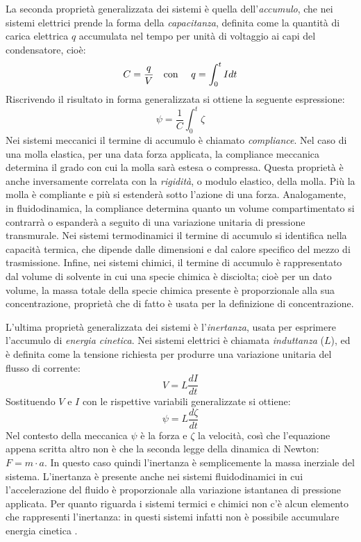 La seconda proprietà generalizzata dei sistemi è quella dell'\textit{accumulo}, che nei sistemi elettrici prende la forma della \textit{capacitanza}, definita come la quantità di carica elettrica $q$ accumulata nel tempo per unità di voltaggio ai capi del condensatore, cioè:
$$C = \frac{q}{V} \text{\quad con \quad} q = \int_0^t{I dt}$$
Riscrivendo il risultato in forma generalizzata si ottiene la seguente espressione:
$$\psi = \frac{1}{C}\int_0^t{\zeta}$$
Nei sistemi meccanici il termine di accumulo è chiamato \textit{compliance}. Nel caso di una molla elastica, per una data forza applicata, la compliance meccanica determina il grado con cui la molla sarà estesa o compressa. Questa proprietà è anche inversamente correlata con la \textit{rigidità}, o modulo elastico, della molla. Più la molla è compliante e più si estenderà sotto l'azione di una forza. Analogamente, in fluidodinamica, la compliance determina quanto un volume compartimentato si contrarrà o espanderà a seguito di una variazione unitaria di pressione transmurale. Nei sistemi termodinamici il termine di accumulo si identifica nella capacità termica, che dipende dalle dimensioni e dal calore specifico del mezzo di trasmissione. Infine, nei sistemi chimici, il termine di accumulo è rappresentato dal volume di solvente in cui una specie chimica è disciolta; cioè per un dato volume, la massa totale della specie chimica presente è proporzionale alla sua concentrazione, proprietà che di fatto è usata per la definizione di concentrazione.

L'ultima proprietà generalizzata dei sistemi è l'\textit{inertanza}, usata per esprimere l'accumulo di \textit{energia cinetica}. Nei sistemi elettrici è chiamata \textit{induttanza} ($L$), ed è definita come la tensione richiesta per produrre una variazione unitaria del flusso di corrente:
$$V = L \frac{dI}{dt}$$
Sostituendo $V$ e $I$ con le rispettive variabili generalizzate si ottiene:
$$\psi = L \frac{d\zeta}{dt}$$
Nel contesto della meccanica $\psi$ è la forza e $\zeta$ la velocità, così che l'equazione appena scritta altro non è che la seconda legge della dinamica di Newton: $F=m \cdot a$. In questo caso quindi l'inertanza è semplicemente la massa inerziale del sistema. L'inertanza è presente anche nei sistemi fluidodinamici in cui l'accelerazione del fluido è proporzionale alla variazione istantanea di pressione applicata. Per quanto riguarda i sistemi termici e chimici non c'è alcun elemento che rappresenti l'inertanza: in questi sistemi infatti non è possibile accumulare energia cinetica \cite{khoo}.

